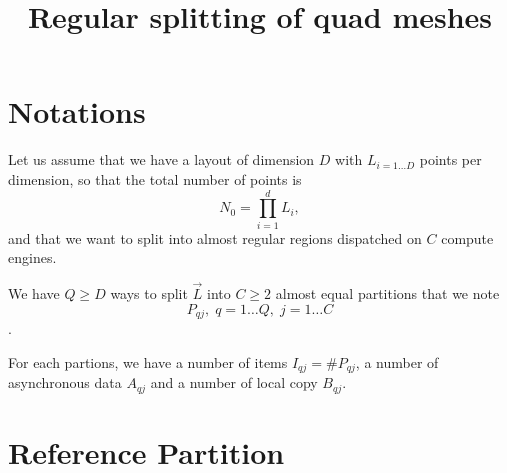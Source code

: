 \documentclass[aps,12pt]{revtex4}
\begin{document}
\title{Regular splitting of quad meshes}
\maketitle

\section{Notations}
Let us assume that we have a layout of dimension $D$
with $L_{i=1\ldots D}$ points per dimension, so
that the total number of points is
$$
	N_0 = \prod_{i=1}^{d} L_i,
$$
and that we want to split into almost regular regions
dispatched on $C$ compute engines.

We have $Q\geq D$ ways to split $\vec{L}$ into $C\geq2$ almost equal partitions
that we note 
$$P_{qj},\;q=1\ldots Q,\;j=1\ldots C$$.

For each partions, we have a number of items $I_{qj} = \# P_{qj}$, a
number of asynchronous data $A_{qj}$ and a number of local copy $B_{qj}$.


\section{Reference Partition}
\end{document}
